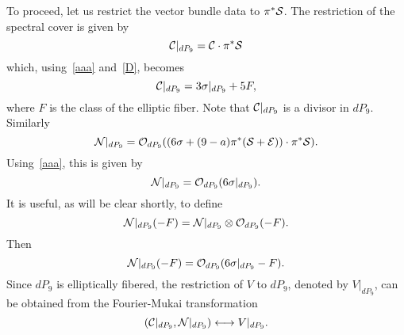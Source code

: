 \documentclass[a4paper,12pt]{article}
\numberwithin{equation}{section}
\theoremstyle{plain}
\begin{document}
To proceed, let us restrict the vector bundle data to
$\pi^{*}{\cal S}$. The restriction of the spectral cover is given by
%
\begin{equation}
{\cal C}|_{dP_9} = {\cal C}\cdot \pi^{*}{\cal S}
\label{42}
\end{equation}
%
which, using~\eqref{aaa} and~\eqref{D}, becomes
%
\begin{equation}
{\cal C}|_{dP_9} = 3 \sigma|_{dP_9} + 5 F,
\label{43}
\end{equation}
%
where $F$ is the class of the elliptic fiber. Note that
${\cal C}|_{dP_9}$ is a divisor in $dP_9$. Similarly
%
\begin{equation}
{\cal N}|_{dP_9} = {\cal O}_{dP_9} ((6\sigma +(9-a)
\pi^{*} ({\cal S}+{\cal E}))\cdot \pi^{*}{\cal S}).
\label{44}
\end{equation}
%
Using~\eqref{aaa}, this is given by
%
\begin{equation}
{\cal N}|_{dP_9} = {\cal O}_{dP_9} (6\sigma|_{dP_9}).
\label{bbb}
\end{equation}
%
It is useful, as will be clear shortly, to define
%
\begin{equation}
{\cal N}|_{dP_9}(-F) ={\cal N}|_{dP_9} \otimes {\cal O}_{dP_9} (-F).
\label{ddd}
\end{equation}
%
Then
%
\begin{equation}
{\cal N}|_{dP_9}(-F) ={\cal O}_{dP_9} (6\sigma|_{dP_9}-F).
\label{eee}
\end{equation}
%
Since $dP_9$ is elliptically fibered, the restriction of $V$ to
$dP_9$, denoted by $V|_{dP_9}$, can be obtained from the Fourier-Mukai
transformation
%
\begin{equation}
({\cal C}|_{dP_9}, {\cal N}|_{dP_9}) \longleftrightarrow V|_{dP_9}.
\label{45}
\end{equation}
%
\end{document}
